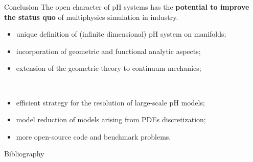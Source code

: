 \documentclass[aspectratio=169]{beamer}
\begin{document}
\begin{frame}{Conclusion}
	The open character of pH systems has the \textbf{potential to improve the status quo} of multiphysics simulation in industry.  \\
	\vspace{.3cm}
	\begin{tcolorbox}[nobeforeafter, colframe=theme,title=First pH systems need to become an established physical theory]%
	\begin{itemize}
		\item unique definition of (infinite dimensional) pH system on manifolds;
		\item incorporation of geometric and functional analytic aspects;
		\item extension of the geometric theory to continuum mechanics;
	\end{itemize}
	\end{tcolorbox} 
	\vspace{.3cm}\\
	\begin{tcolorbox}[nobeforeafter, colframe=theme,title=For engineering pH systems need to be more efficient than the available tools]%
	\begin{itemize}
		\item efficient strategy for the resolution of large-scale pH models;
		\item model reduction of models arising from PDEs discretization;
		\item more open-source code and benchmark problems.
	\end{itemize}
	\end{tcolorbox}

\end{frame}
	
\begin{frame}[allowframebreaks]{Bibliography}
	\printbibliography
\end{frame}

	\appendix
	
	
	
	
\end{document}
